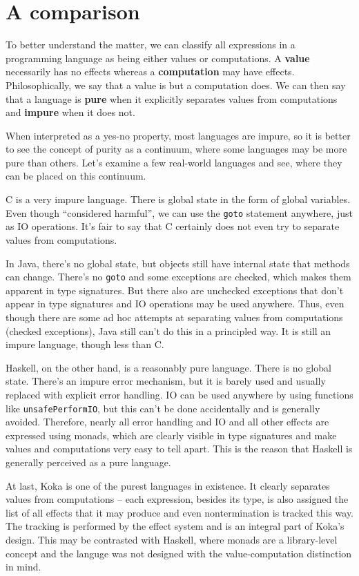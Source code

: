 \documentclass[declaration,inz,english,shortabstract]{iithesis}
\newcommand{\m}[1]{\texttt{#1}}
\begin{document}
\section{A comparison}

To better understand the matter, we can classify all expressions in a programming language as being either values or computations. A \textbf{value} necessarily has no effects whereas a \textbf{computation} may have effects. Philosophically, we say that a value is but a computation does. We can then say that a language is \textbf{pure} when it explicitly separates values from computations and \textbf{impure} when it does not.

When interpreted as a yes-no property, most languages are impure, so it is better to see the concept of purity as a continuum, where some languages may be more pure than others. Let's examine a few real-world languages and see, where they can be placed on this continuum.

C is a very impure language. There is global state in the form of global variables. Even though ``considered harmful'', we can use the \m{goto} statement anywhere, just as IO operations. It's fair to say that C certainly does not even try to separate values from computations.

In Java, there's no global state, but objects still have internal state that methods can change. There's no \m{goto} and some exceptions are checked, which makes them apparent in type signatures. But there also are unchecked exceptions that don't appear in type signatures and IO operations may be used anywhere. Thus, even though there are some ad hoc attempts at separating values from computations (checked exceptions), Java still can't do this in a principled way. It is still an impure language, though less than C.

Haskell, on the other hand, is a reasonably pure language. There is no global state. There's an impure error mechanism, but it is barely used and usually replaced with explicit error handling. IO can be used anywhere by using functions like \m{unsafePerformIO}, but this can't be done accidentally and is generally avoided. Therefore, nearly all error handling and IO and all other effects are expressed using monads, which are clearly visible in type signatures and make values and computations very easy to tell apart. This is the reason that Haskell is generally perceived as a pure language.

At last, Koka \cite{Koka} is one of the purest languages in existence. It clearly separates values from computations -- each expression, besides its type, is also assigned the list of all effects that it may produce and even nontermination is tracked this way. The tracking is performed by the effect system and is an integral part of Koka's design. This may be contrasted with Haskell, where monads are a library-level concept and the languge was not designed with the value-computation distinction in mind.
\end{document}
